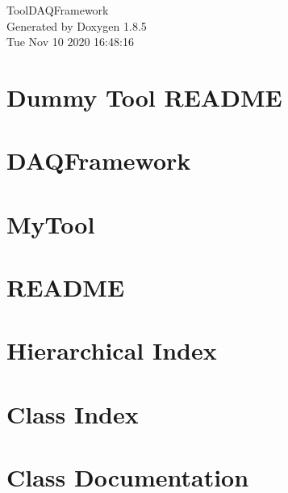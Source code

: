 \documentclass[twoside]{book}
\newcommand{\clearemptydoublepage}{%
  \newpage{\pagestyle{empty}\cleardoublepage}%
}
\begin{document}
\hypersetup{pageanchor=false}
\begin{titlepage}
\vspace*{7cm}
\begin{center}%
{\Large Tool\-D\-A\-Q\-Framework }\\
\vspace*{1cm}
{\large Generated by Doxygen 1.8.5}\\
\vspace*{0.5cm}
{\small Tue Nov 10 2020 16:48:16}\\
\end{center}
\end{titlepage}
\clearemptydoublepage
\tableofcontents
\clearemptydoublepage
{}
\hypersetup{pageanchor=true}

\chapter{Dummy Tool R\-E\-A\-D\-M\-E}
\label{md_UserTools_DummyTool_README}
\hypertarget{md_UserTools_DummyTool_README}{}

\chapter{D\-A\-Q\-Framework}
\label{md_UserTools_README}
\hypertarget{md_UserTools_README}{}

\chapter{My\-Tool}
\label{md_UserTools_template_README}
\hypertarget{md_UserTools_template_README}{}

\chapter{R\-E\-A\-D\-M\-E}
\label{md_DataModel_README}
\hypertarget{md_DataModel_README}{}

\chapter{Hierarchical Index}

\chapter{Class Index}

\chapter{Class Documentation}


















\newpage
{}
{}
\printindex
\end{document}
